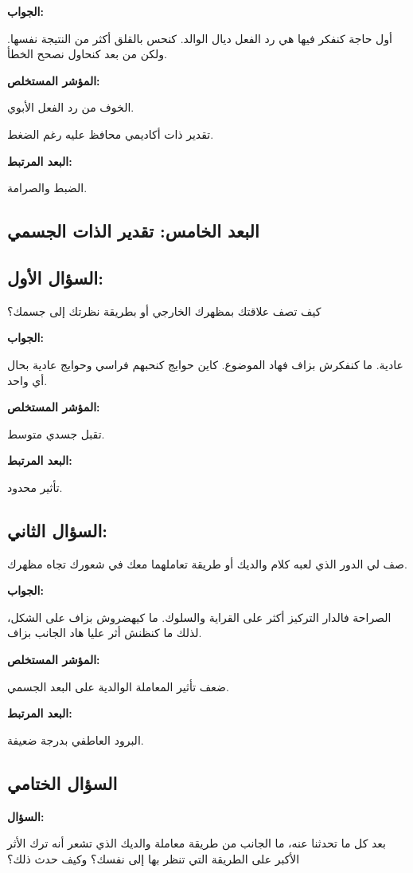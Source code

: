 \documentclass[12pt,oneside]{report}
\begin{document}
\noindent\textbf{الجواب:}\par
أول حاجة كنفكر فيها هي رد الفعل ديال الوالد. كنحس بالقلق أكثر من النتيجة نفسها. ولكن من بعد كنحاول نصحح الخطأ.

\noindent\textbf{المؤشر المستخلص:}\par
الخوف من رد الفعل الأبوي.

تقدير ذات أكاديمي محافظ عليه رغم الضغط.

\noindent\textbf{البعد المرتبط:}\par
الضبط والصرامة.

\subsection*{البعد الخامس: تقدير الذات الجسمي}
\subsection*{السؤال الأول:}
كيف تصف علاقتك بمظهرك الخارجي أو بطريقة نظرتك إلى جسمك؟

\noindent\textbf{الجواب:}\par
عادية. ما كنفكرش بزاف فهاد الموضوع. كاين حوايج كنحبهم فراسي وحوايج عادية بحال أي واحد.

\noindent\textbf{المؤشر المستخلص:}\par
تقبل جسدي متوسط.

\noindent\textbf{البعد المرتبط:}\par
تأثير محدود.

\subsection*{السؤال الثاني:}
صف لي الدور الذي لعبه كلام والديك أو طريقة تعاملهما معك في شعورك تجاه مظهرك.

\noindent\textbf{الجواب:}\par
الصراحة فالدار التركيز أكثر على القراية والسلوك. ما كيهضروش بزاف على الشكل، لذلك ما كنظنش أثر عليا هاد الجانب بزاف.

\noindent\textbf{المؤشر المستخلص:}\par
ضعف تأثير المعاملة الوالدية على البعد الجسمي.

\noindent\textbf{البعد المرتبط:}\par
البرود العاطفي بدرجة ضعيفة.

\subsection*{السؤال الختامي}
\noindent\textbf{السؤال:}\par
بعد كل ما تحدثنا عنه، ما الجانب من طريقة معاملة والديك الذي تشعر أنه ترك الأثر الأكبر على الطريقة التي تنظر بها إلى نفسك؟ وكيف حدث ذلك؟
\end{document}
